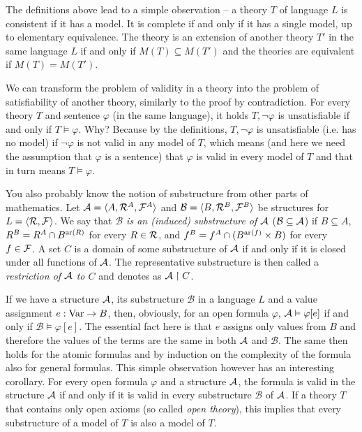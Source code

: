 The definitions above lead to a simple observation -- a theory $T$ of language $L$ is consistent if it has a model. It is complete if and only if it has a single model, up to elementary equivalence. The theory is an extension of another theory $T'$ in the same language $L$ if and only if $M(T) \subseteq M(T')$ and the theories are equivalent if $M(T) = M(T')$.

We can transform the problem of validity in a theory into the problem of satisfiability of another theory, similarly to the proof by contradiction. For every theory $T$ and sentence $\varphi$ (in the same language), it holds $T, \neg \varphi$ is unsatisfiable if and only if $T \vDash \varphi$. Why? Because by the definitions, $T, \neg \varphi$ is unsatisfiable (i.e. has no model) if $\neg \varphi$ is not valid in any model of $T$, which means (and here we need the assumption that $\varphi$ is a sentence) that $\varphi$ is valid in every model of $T$ and that in turn means $T \vDash \varphi$. 

You also probably know the notion of substructure from other parts of mathematics. Let $\mathcal{A} = \langle A, \mathcal{R}^A, \mathcal{F}^A \rangle$ and $\mathcal{B} = \langle B, \mathcal{R}^B, \mathcal{F}^B \rangle$ be structures for $L = \langle \mathcal{R}, \mathcal{F} \rangle$. We say that \emph{$\mathcal{B}$ is an (induced) substructure of $\mathcal{A}$} ($\mathcal{B} \subseteq \mathcal{A}$) if $B \subseteq A$, $R^B = R^A \cap B^{\operatorname{ar}(R)}$ for every $R \in \mathcal{R}$, and $f^B = f^A \cap (B^{\operatorname{ar}(f)}\times B)$ for every $f \in \mathcal{F}$. A set $C$ is a domain of some substructure of $\mathcal{A}$ if and only if it is closed under all functions of $\mathcal{A}$. The representative substructure is then called a \emph{restriction of $\mathcal{A}$ to $C$} and denotes as $\mathcal{A} \upharpoonright C$.

If we have a structure $\mathcal{A}$, its substructure $\mathcal{B}$ in a language $L$ and a value assignment $e: \operatorname{Var} \to B$, then, obviously, for an open formula $\varphi$, $\mathcal{A} \vDash \varphi[e]$ if and only if $\mathcal{B} \vDash \varphi[e]$. The essential fact here is that $e$ assigns only values from $B$ and therefore the values of the terms are the same in both $\mathcal{A}$ and $\mathcal{B}$. The same then holds for the atomic formulas and by induction on the complexity of the formula also for general formulas. This simple observation however has an interesting corollary. For every open formula $\varphi$ and a structure $\mathcal{A}$, the formula is valid in the structure $\mathcal{A}$ if and only if it is valid in every substructure $\mathcal{B}$ of $\mathcal{A}$. If a theory $T$ that contains only open axioms (so called \emph{open theory}), this implies that every substructure of a model of $T$ is also a model of $T$.

